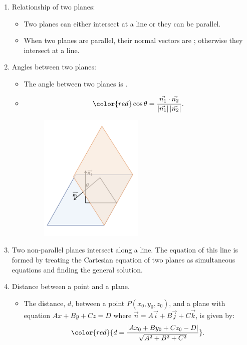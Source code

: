 \documentclass[12pt, a4paper]{article}
\begin{document}
\begin{enumerate}
  \item Relationship of two planes: 
  \begin{itemize}
    \item Two planes can either intersect at a line or they can be parallel.
    \item When two planes are parallel, their normal vectors are {\color{red}{collinear}}; otherwise they intersect at a line. 
  \end{itemize}
  \item Angles between two planes: 
  \begin{itemize}
    \item The angle between two planes is \textbf{\color{red}{the angle between their normal vectors}}.
    \item $$\color{red} \cos\theta=\frac{\vec{n_1}\cdot\vec{n_2}}{\left|\vec{n_1}\right|\left|\vec{n_2}\right|}.$$
    \begin{figure}[H]
      \centering
      \includegraphics[width=0.5\textwidth]{Fig.3.15.jpg}
    \end{figure}
  \end{itemize}
  \item Two non-parallel planes intersect along a line. The equation of this line is formed by treating the Cartesian equation of two planes as simultaneous equations and finding the general solution.
  \item Distance between a point and a plane. 
  \begin{itemize}
    \item The distance, $d$, between a point $P(x_0,y_0,z_0)$, and a plane with equation $Ax+By+Cz=D$ where $\vec{n}=A\vec{i}+B\vec{j}+C\vec{k}$, is given by: 
    $${\color{red}{d=\frac{\left|Ax_0+By_0+Cz_0-D\right|}{\sqrt{A^2+B^2+C^2}}}}.$$ 

\end{itemize}
\end{enumerate}
\end{document}
